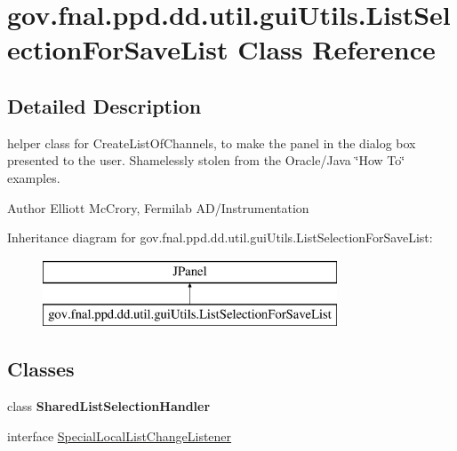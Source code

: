 \hypertarget{classgov_1_1fnal_1_1ppd_1_1dd_1_1util_1_1guiUtils_1_1ListSelectionForSaveList}{\section{gov.\-fnal.\-ppd.\-dd.\-util.\-gui\-Utils.\-List\-Selection\-For\-Save\-List Class Reference}
\label{classgov_1_1fnal_1_1ppd_1_1dd_1_1util_1_1guiUtils_1_1ListSelectionForSaveList}
}


\subsection{Detailed Description}
helper class for Create\-List\-Of\-Channels, to make the panel in the dialog box presented to the user. Shamelessly stolen from the Oracle/\-Java \char`\"{}\-How To\char`\"{} examples.

\begin{DoxyAuthor}{Author}
Elliott Mc\-Crory, Fermilab A\-D/\-Instrumentation 
\end{DoxyAuthor}
Inheritance diagram for gov.\-fnal.\-ppd.\-dd.\-util.\-gui\-Utils.\-List\-Selection\-For\-Save\-List\-:\begin{figure}[H]
\begin{center}
\leavevmode
\includegraphics[height=2.000000cm]{classgov_1_1fnal_1_1ppd_1_1dd_1_1util_1_1guiUtils_1_1ListSelectionForSaveList}
\end{center}
\end{figure}
\subsection*{Classes}
\begin{DoxyCompactItemize}
\item 
class {\bfseries Shared\-List\-Selection\-Handler}
\item 
interface \hyperlink{interfacegov_1_1fnal_1_1ppd_1_1dd_1_1util_1_1guiUtils_1_1ListSelectionForSaveList_1_1SpecialLocalListChangeListener}{Special\-Local\-List\-Change\-Listener}
\end{DoxyCompactItemize}
